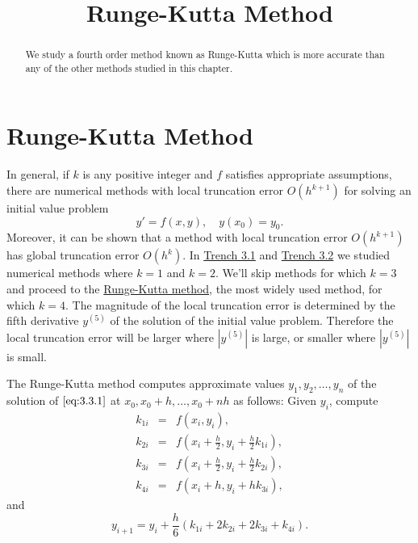 \documentclass{ximera}
\title{Runge-Kutta Method}
\begin{document}

\begin{abstract}
We study a fourth order method known as Runge-Kutta which is more accurate than any of the other methods studied in this chapter.
\end{abstract}

\maketitle

\section*{Runge-Kutta Method}

In general, if $k$ is any  positive  integer  and $f$
satisfies appropriate assumptions, there are numerical methods with
local truncation error  $O(h^{k+1})$ for solving an initial value
problem
\begin{equation} \label{eq:3.3.1}
y'=f(x,y),\quad y(x_0)=y_0.
\end{equation}
Moreover, it can be shown that a method with local truncation error
$O(h^{k+1})$ has global truncation error $O(h^k)$. In
\href{https://ximera.osu.edu/ode/main/eulersMethod/eulersMethod}{Trench 3.1} and \href{https://ximera.osu.edu/ode/main/improvedEuler/improvedEuler}{Trench 3.2} we studied numerical
methods where
$k=1$ and $k=2$. We'll skip methods for which $k=3$ and proceed to the
\href{https://en.wikipedia.org/wiki/Runge%E2%80%93Kutta_methods}{Runge-Kutta method}, the most widely used
method, for which $k=4$. The magnitude of the local truncation error is
determined by the fifth derivative $y^{(5)}$ of the solution of the
initial value problem. Therefore the local truncation error will be
larger where $|y^{(5)}|$ is large, or smaller where $|y^{(5)}|$ is
small.

The Runge-Kutta method computes approximate values
$y_1, y_2, \dots, y_n$ of the solution of $\eqref{eq:3.3.1}$
at $x_0, x_0+h, \dots, x_0+nh$ as follows: Given $y_i$,
compute
\begin{eqnarray*} k_{1i}&=&f(x_i,y_i),\\
k_{2i}&=&f\left(x_i+\frac{h}{2},y_i+\frac{h}{2}k_{1i}\right),\\
k_{3i}&=&f\left(x_i+\frac{h}{2},y_i+\frac{h}{2}k_{2i}\right),\\
k_{4i}&=&f(x_i+h,y_i+hk_{3i}),
\end{eqnarray*}
and
$$
y_{i+1}=y_i+\frac{h}{6}(k_{1i}+2k_{2i}+2k_{3i}+k_{4i}).
$$
\end{document}
